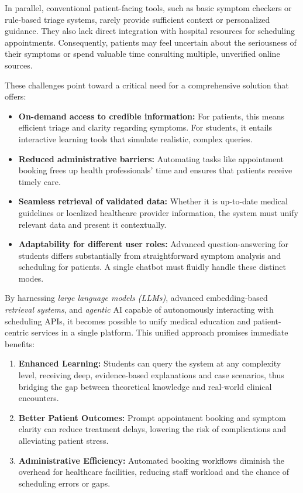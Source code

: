 \noindent In parallel, conventional patient-facing tools, such as basic symptom checkers or rule-based triage systems, rarely provide sufficient context or personalized guidance. They also lack direct integration with hospital resources for scheduling appointments. Consequently, patients may feel uncertain about the seriousness of their symptoms or spend valuable time consulting multiple, unverified online sources.

\noindent These challenges point toward a critical need for a comprehensive solution that offers:
\begin{itemize}
    \item \textbf{On-demand access to credible information:} 
    For patients, this means efficient triage and clarity regarding symptoms. For students, it entails interactive learning tools that simulate realistic, complex queries.
    \item \textbf{Reduced administrative barriers:} 
    Automating tasks like appointment booking frees up health professionals’ time and ensures that patients receive timely care. 
    \item \textbf{Seamless retrieval of validated data:} 
    Whether it is up-to-date medical guidelines or localized healthcare provider information, the system must unify relevant data and present it contextually. 
    \item \textbf{Adaptability for different user roles:}
    Advanced question-answering for students differs substantially from straightforward symptom analysis and scheduling for patients. A single chatbot must fluidly handle these distinct modes.
\end{itemize}

\noindent By harnessing \emph{large language models (LLMs)}, advanced embedding-based \emph{retrieval systems}, and \emph{agentic} AI capable of autonomously interacting with scheduling APIs, it becomes possible to unify medical education and patient-centric services in a single platform. This unified approach promises immediate benefits:
\begin{enumerate}
    \item \textbf{Enhanced Learning:} Students can query the system at any complexity level, receiving deep, evidence-based explanations and case scenarios, thus bridging the gap between theoretical knowledge and real-world clinical encounters.
    \item \textbf{Better Patient Outcomes:} Prompt appointment booking and symptom clarity can reduce treatment delays, lowering the risk of complications and alleviating patient stress.
    \item \textbf{Administrative Efficiency:} Automated booking workflows diminish the overhead for healthcare facilities, reducing staff workload and the chance of scheduling errors or gaps.
\end{enumerate}

